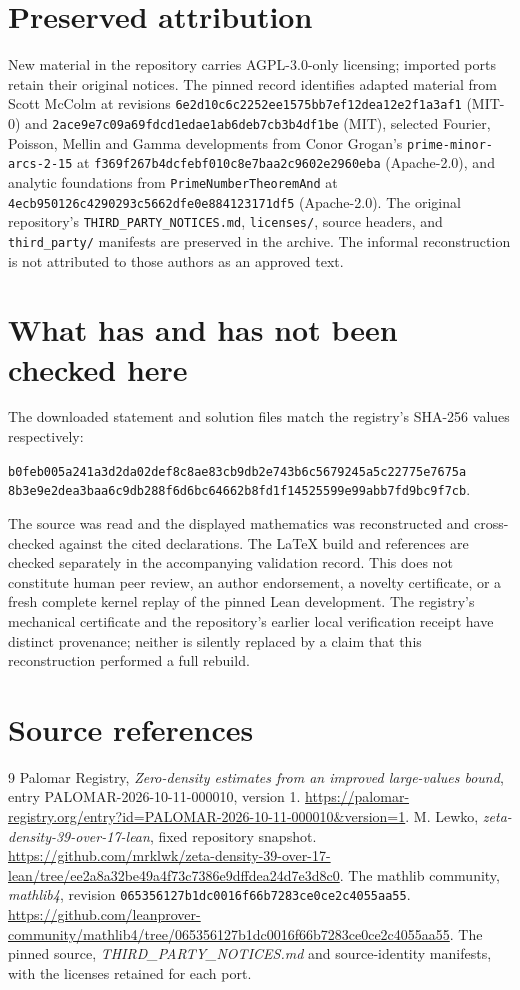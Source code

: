 \documentclass[11pt,a4paper,oneside]{book}
\theoremstyle{definition}
\newcommand{\lean}[1]{\nolinkurl{#1}}
\begin{document}
\section{Preserved attribution}
New material in the repository carries AGPL-3.0-only licensing; imported ports
retain their original notices. The pinned record identifies adapted material
from Scott McColm at revisions
\lean{6e2d10c6c2252ee1575bb7ef12dea12e2f1a3af1} (MIT-0) and
\lean{2ace9e7c09a69fdcd1edae1ab6deb7cb3b4df1be} (MIT), selected Fourier,
Poisson, Mellin and Gamma developments from Conor Grogan's
\lean{prime-minor-arcs-2-15} at
\lean{f369f267b4dcfebf010c8e7baa2c9602e2960eba} (Apache-2.0), and analytic
foundations from \lean{PrimeNumberTheoremAnd} at
\lean{4ecb950126c4290293c5662dfe0e884123171df5} (Apache-2.0).
The original repository's \lean{THIRD_PARTY_NOTICES.md}, \lean{licenses/},
source headers, and \lean{third_party/} manifests are preserved in the
archive. The informal reconstruction is not attributed to those authors as
an approved text.

\section{What has and has not been checked here}
The downloaded statement and solution files match the registry's SHA-256
values respectively:
\begin{center}
\lean{b0feb005a241a3d2da02def8c8ae83cb9db2e743b6c5679245a5c22775e7675a}\\
\lean{8b3e9e2dea3baa6c9db288f6d6bc64662b8fd1f14525599e99abb7fd9bc9f7cb}.
\end{center}
The source was read and the displayed mathematics was reconstructed and
cross-checked against the cited declarations. The LaTeX build and references
are checked separately in the accompanying validation record. This does not
constitute human peer review, an author endorsement, a novelty certificate,
or a fresh complete kernel replay of the pinned Lean development.
The registry's mechanical certificate and the repository's earlier local
verification receipt have distinct provenance; neither is silently replaced
by a claim that this reconstruction performed a full rebuild.

\section{Source references}
\begin{thebibliography}{9}
Palomar Registry, \emph{Zero-density estimates from an improved large-values
bound}, entry PALOMAR-2026-10-11-000010, version 1.
\url{https://palomar-registry.org/entry?id=PALOMAR-2026-10-11-000010&version=1}.
M. Lewko, \emph{zeta-density-39-over-17-lean}, fixed repository snapshot.
\url{https://github.com/mrklwk/zeta-density-39-over-17-lean/tree/ee2a8a32be49a4f73c7386e9dffdea24d7e3d8c0}.
The mathlib community, \emph{mathlib4}, revision
\lean{065356127b1dc0016f66b7283ce0ce2c4055aa55}.
\url{https://github.com/leanprover-community/mathlib4/tree/065356127b1dc0016f66b7283ce0ce2c4055aa55}.
The pinned source, \emph{THIRD\_PARTY\_NOTICES.md} and source-identity
manifests, with the licenses retained for each port.
\end{thebibliography}
\end{document}
